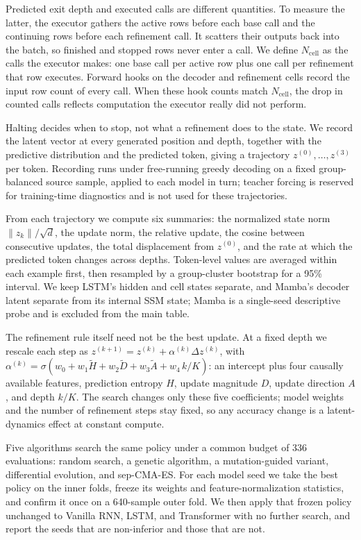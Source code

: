\documentclass[11pt]{article}
\begin{document}
Predicted exit depth and executed calls are different quantities. To measure the latter, the executor gathers the active rows before each base call and the continuing rows before each refinement call. It scatters their outputs back into the batch, so finished and stopped rows never enter a call. We define $N_{\mathrm{cell}}$ as the calls the executor makes: one base call per active row plus one call per refinement that row executes. Forward hooks on the decoder and refinement cells record the input row count of every call. When these hook counts match $N_{\mathrm{cell}}$, the drop in counted calls reflects computation the executor really did not perform.

Halting decides when to stop, not what a refinement does to the state. We record the latent vector at every generated position and depth, together with the predictive distribution and the predicted token, giving a trajectory $z^{(0)},\dots,z^{(3)}$ per token. Recording runs under free-running greedy decoding on a fixed group-balanced source sample, applied to each model in turn; teacher forcing is reserved for training-time diagnostics and is not used for these trajectories.

From each trajectory we compute six summaries: the normalized state norm $\lVert z_k\rVert/\sqrt d$, the update norm, the relative update, the cosine between consecutive updates, the total displacement from $z^{(0)}$, and the rate at which the predicted token changes across depths. Token-level values are averaged within each example first, then resampled by a group-cluster bootstrap for a 95\% interval. We keep LSTM's hidden and cell states separate, and Mamba's decoder latent separate from its internal SSM state; Mamba is a single-seed descriptive probe and is excluded from the main table.

The refinement rule itself need not be the best update. At a fixed depth we rescale each step as $z^{(k+1)}=z^{(k)}+\alpha^{(k)}\Delta z^{(k)}$, with $\alpha^{(k)}=\sigma(w_0+w_1\tilde H+w_2\tilde D+w_3\tilde A+w_4\,k/K)$: an intercept plus four causally available features, prediction entropy $H$, update magnitude $D$, update direction $A$, and depth $k/K$. The search changes only these five coefficients; model weights and the number of refinement steps stay fixed, so any accuracy change is a latent-dynamics effect at constant compute.

Five algorithms search the same policy under a common budget of 336 evaluations: random search, a genetic algorithm, a mutation-guided variant, differential evolution, and sep-CMA-ES. For each model seed we take the best policy on the inner folds, freeze its weights and feature-normalization statistics, and confirm it once on a 640-sample outer fold. We then apply that frozen policy unchanged to Vanilla RNN, LSTM, and Transformer with no further search, and report the seeds that are non-inferior and those that are not.
\end{document}
